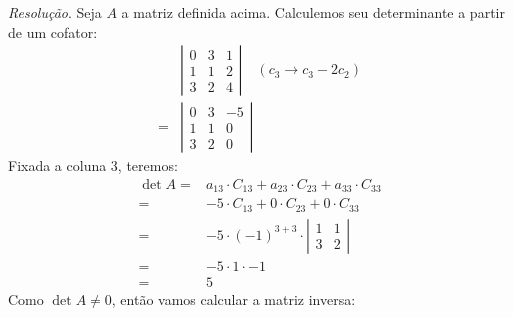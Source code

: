 \emph{Resolução}. Seja $A$ a matriz definida acima. Calculemos seu determinante a partir de um cofator:
\begin{align*}
    &\left|\begin{array}{ccc}
         0 & 3 & 1 \\
         1 & 1 & 2 \\
         3 & 2 & 4
    \end{array}\right| \quad (c_3 \rightarrow c_3 - 2c_2) \\ =
    &\left|\begin{array}{ccc}
         0 & 3 & -5 \\
         1 & 1 & 0 \\
         3 & 2 & 0
    \end{array}\right|
\end{align*}
Fixada a coluna 3, teremos:
\begin{align*}
    \det A =& a_{13} \cdot C_{13} + a_{23} \cdot C_{23} + a_{33} \cdot C_{33} \\ =&
    -5 \cdot C_{13} + 0 \cdot C_{23} + 0 \cdot  C_{33} \\ =&
    -5 \cdot (-1)^{3 + 3} \cdot 
    \left|\begin{array}{cc}
        1&1 \\
        3&2
    \end{array} \right| \\ =&
    -5 \cdot 1 \cdot -1 \\ =&
    5
\end{align*}
Como $\det A \ne 0$, então vamos calcular a matriz inversa:
